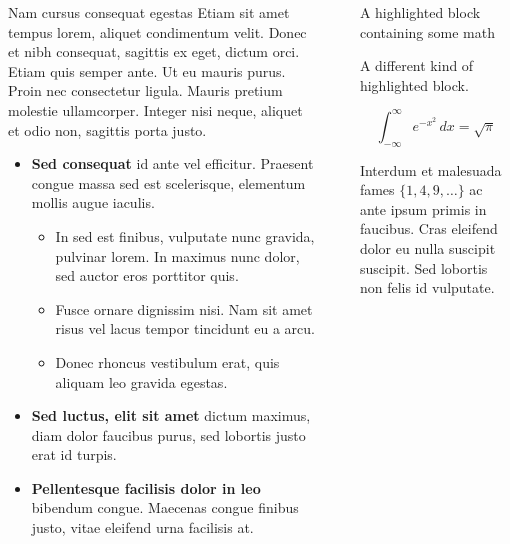 \documentclass[final]{beamer}
\newlength{\sepwidth}
\newlength{\colwidth}
\newcommand{\separatorcolumn}{\begin{column}{\sepwidth}\end{column}}
\begin{document}
\begin{frame}[t]
\begin{columns}[t]
\begin{column}{\colwidth}
\begin{block}{Nam cursus consequat egestas}
    Etiam sit amet tempus lorem, aliquet condimentum velit. Donec et nibh
    consequat, sagittis ex eget, dictum orci. Etiam quis semper ante. Ut eu
    mauris purus. Proin nec consectetur ligula. Mauris pretium molestie
    ullamcorper. Integer nisi neque, aliquet et odio non, sagittis porta justo.

    \begin{itemize}
      \item \textbf{Sed consequat} id ante vel efficitur. Praesent congue massa
        sed est scelerisque, elementum mollis augue iaculis.
        \begin{itemize}
          \item In sed est finibus, vulputate
            nunc gravida, pulvinar lorem. In maximus nunc dolor, sed auctor eros
            porttitor quis.
          \item Fusce ornare dignissim nisi. Nam sit amet risus vel lacus
            tempor tincidunt eu a arcu.
          \item Donec rhoncus vestibulum erat, quis aliquam leo
            gravida egestas.
        \end{itemize}
      \item \textbf{Sed luctus, elit sit amet} dictum maximus, diam dolor
        faucibus purus, sed lobortis justo erat id turpis.
      \item \textbf{Pellentesque facilisis dolor in leo} bibendum congue.
        Maecenas congue finibus justo, vitae eleifend urna facilisis at.
    \end{itemize}

  \end{block}

\end{column}

\separatorcolumn

\begin{column}{\colwidth}

  \begin{exampleblock}{A highlighted block containing some math}

    A different kind of highlighted block.

    $$
    \int_{-\infty}^{\infty} e^{-x^2}\,dx = \sqrt{\pi}
    $$

    Interdum et malesuada fames $\{1, 4, 9, \ldots\}$ ac ante ipsum primis in
    faucibus. Cras eleifend dolor eu nulla suscipit suscipit. Sed lobortis non
    felis id vulputate.



\end{exampleblock}
\end{column}
\end{columns}
\end{frame}
\end{document}
